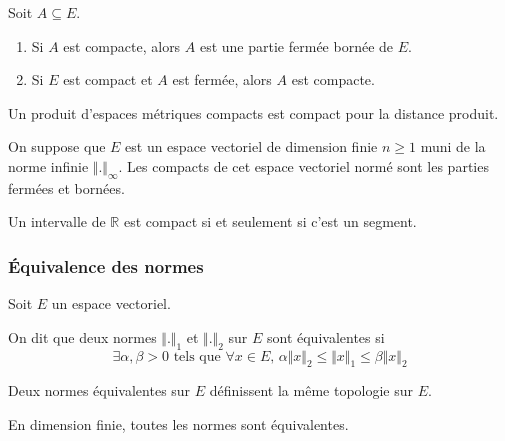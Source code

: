   \begin{proposition}
    Soit $A \subseteq E$.
    \begin{enumerate}[label=(\roman*)]
      \item Si $A$ est compacte, alors $A$ est une partie fermée bornée de $E$.
      \item Si $E$ est compact et $A$ est fermée, alors $A$ est compacte.
    \end{enumerate}
  \end{proposition}

  \begin{proposition}
    Un produit d'espaces métriques compacts est compact pour la distance produit.
  \end{proposition}

  \begin{proposition}
    On suppose que $E$ est un espace vectoriel de dimension finie $n \geq 1$ muni de la norme infinie $\Vert . \Vert_\infty$. Les compacts de cet espace vectoriel normé sont les parties fermées et bornées.
  \end{proposition}

  \begin{application}
    Un intervalle de $\mathbb{R}$ est compact si et seulement si c'est un segment.
  \end{application}

  \subsubsection{Équivalence des normes}


  Soit $E$ un espace vectoriel.

  \begin{definition}
    On dit que deux normes $\Vert . \Vert_1$ et $\Vert . \Vert_2$ sur $E$ sont équivalentes si
    \[ \exists \alpha, \beta > 0 \text{ tels que } \forall x \in E, \, \alpha \Vert x \Vert_2 \leq \Vert x \Vert_1 \leq \beta \Vert x \Vert_2 \]
  \end{definition}

  \begin{remark}
    Deux normes équivalentes sur $E$ définissent la même topologie sur $E$.
  \end{remark}


  \begin{theorem}
    En dimension finie, toutes les normes sont équivalentes.
  \end{theorem}

